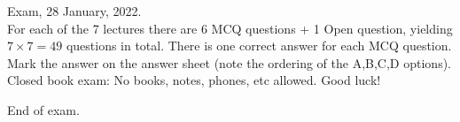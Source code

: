\documentclass[10pt]{article}
\begin{document}
\parindent0pt

Exam, 28 January, 2022. \\

For each of the 7 lectures there are 6 MCQ questions + 1 Open question, yielding $7 \times 7 = 49$ questions in total. There is one correct answer for each MCQ question. Mark the answer on the answer sheet (note the ordering of the A,B,C,D options). Closed book exam: No books, notes, phones, etc allowed. Good luck! 

\begin{flushright}

\end{flushright}

End of exam.
\end{document}
